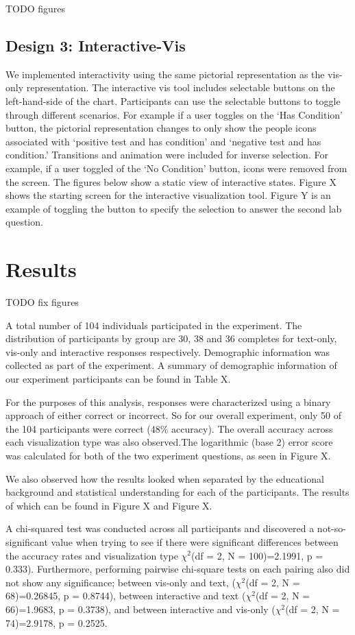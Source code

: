 TODO figures

\subsection{Design 3: Interactive-Vis}
We implemented interactivity using the same pictorial representation as the
vis-only representation. The interactive vis tool includes selectable buttons
on the left-hand-side of the chart. Participants can use the selectable
buttons to toggle through different scenarios. For example if a user toggles
on the ‘Has Condition’ button, the pictorial representation changes to only
show the people icons associated with ‘positive test and has condition’ and
‘negative test and has condition.’ Transitions and animation were included
for inverse selection. For example, if a user toggled of the ‘No Condition’
button, icons were removed from the screen. The figures below show a static
view of interactive states. Figure X shows the starting screen for the
interactive visualization tool. Figure Y is an example of toggling the button
to specify the selection to answer the second lab question.


\section{Results}

TODO fix figures

A total number of 104 individuals participated in the experiment. The
distribution of participants by group are 30, 38 and 36 completes for
text-only, vis-only and interactive responses respectively. Demographic
information was collected as part of the experiment. A summary of demographic
information of our experiment participants can be found in Table X.

For the purposes of this analysis, responses were characterized using a
binary approach of either correct or incorrect. So for our overall
experiment, only 50 of the 104 participants were correct (48\% accuracy). The
overall accuracy across each visualization type was also observed.The
logarithmic (base 2) error score was calculated for both of the two
experiment questions, as seen in Figure X.

We also observed how the results looked when separated by the educational
background and statistical understanding for each of the participants. The
results of which can be found in Figure X and Figure X.

A chi-squared test was conducted across all participants and discovered a
not-so-significant value when trying to see if there were significant
differences between the accuracy rates and visualization type $\chi^2$(df = 2, N = 100)=2.1991, p = 0.333). Furthermore,
performing pairwise chi-square tests on each pairing also did not show any
significance; between vis-only and text, ($\chi^2$(df = 2, N = 68)=0.26845, p =
0.8744), between interactive and text ($\chi^2$(df = 2, N = 66)=1.9683, p =
0.3738), and between interactive and vis-only ($\chi^2$(df = 2, N = 74)=2.9178,
p = 0.2525.



